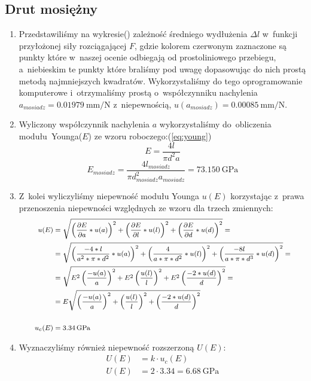 \documentclass{fizraport}
\begin{document}
\newpage
\subsection{Drut mosiężny}
\begin{enumerate}
    \item Przedstawiliśmy na wykresie() zależność średniego wydłużenia $\Delta l$ w~funkcji przyłożonej siły rozciągającej $F$, gdzie kolorem czerwonym zaznaczone są punkty które w~naszej ocenie odbiegają od prostoliniowego
przebiegu, a~niebieskim te punkty które braliśmy pod uwagę dopasowując do nich prostą metodą najmniejszych kwadratów. Wykorzystaliśmy do tego oprogramowanie komputerowe i~otrzymaliśmy prostą o~współczynniku nachylenia $a_{mosiadz}=\SI{0.01979}{\milli\metre\per\newton}$ z~niepewnością, $u(a_{mosiadz})=\SI{0.00085}{\milli\metre\per\newton}$.

\item 
Wyliczony współczynnik nachylenia $a$ wykorzystaliśmy do~obliczenia modułu~Younga($E$) ze wzoru roboczego:(\ref{eq:young})
\begin{equation*}
    E = \frac{4l}{\pi d^2 a}
\end{equation*}
\begin{equation*}
    E_{mosiadz} = \frac{4l_{mosiadz}}{\pi d_{mosiadz}^2 a_{mosiadz}}=\SI{73.150}{\giga\pascal}
\end{equation*}

\item Z~kolei wyliczyliśmy niepewność modułu Younga $u(E)$ korzystając z~prawa przenoszenia
niepewności względnych ze wzoru dla trzech zmiennych:
\begin{equation*}
\footnotesize
\begin{split}
    u(E)&=\sqrt{\left (\frac{\partial E}{\partial a}*u(a)\right )^2+\left (\frac{\partial E}{\partial l}*u(l)\right )^2+\left (\frac{\partial E}{\partial d}*u(d)\right )^2}=\\
&=\sqrt{\left(\frac{-4*l}{a^2*\pi *d^2}*u(a)\right)^2+\left(\frac{4}{a*\pi *d^2}*u(l)\right)^2+\left(\frac{-8l}{a*\pi *d^3}*u(d)\right)^2}=\\
&= \sqrt{E^2\left (\frac{-u(a)}{a} \right )^2 + E^2\left (\frac{u(l)}{l} \right )^2 + E^2\left (\frac{-2*u(d)}{d} \right )^2}=\\
&= E\sqrt{\left (\frac{-u(a)}{a} \right )^2 + \left (\frac{u(l)}{l} \right )^2 + \left (\frac{-2*u(d)}{d} \right )^2} \\
\\
u_c(E) &=  \SI{3.34}{\giga\pascal}
\end{split}
\end{equation*}

\item Wyznaczyliśmy również niepewność rozszerzoną $U(E)$:
\begin{align*}
        U(E) &= k \cdot u_c(E) \\
        U(E) &= 2 \cdot 3.34 = \SI{6.68}{\giga\pascal}
\end{align*}
\end{enumerate}
\end{document}
